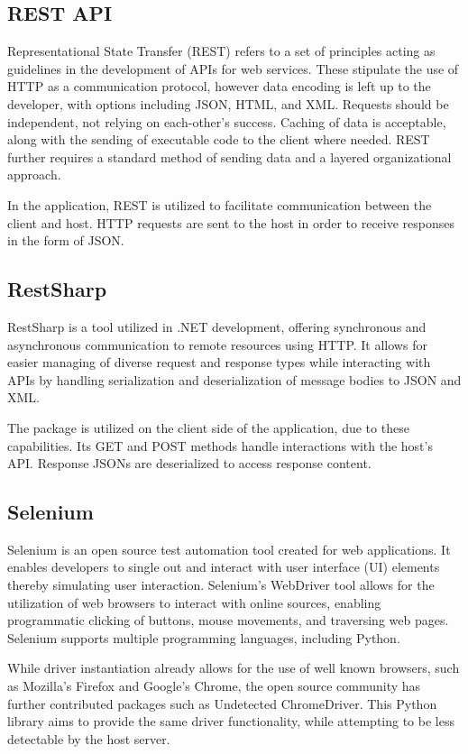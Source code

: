 \documentclass{thesis-ekf}
\theoremstyle{definition}
\theoremstyle{remark}
\begin{document}
\subsection{REST API}
Representational State Transfer (REST) refers to a set of principles acting as guidelines in the development of APIs for web services. These stipulate the use of HTTP as a communication protocol, however data encoding is left up to the developer, with options including JSON, HTML, and XML. Requests should be independent, not relying on each-other's success. Caching of data is acceptable, along with the sending of executable code to the client where needed. REST further requires a standard method of sending data and a layered organizational approach. \cite{redhat-rest}

In the application, REST is utilized to facilitate communication between the client and host. HTTP requests are sent to the host in order to receive responses in the form of JSON.  

\subsection{RestSharp}
RestSharp is a tool utilized in .NET development, offering synchronous and asynchronous communication to remote resources using HTTP. It allows for easier managing of diverse request and response types while interacting with APIs by handling serialization and deserialization of message bodies to JSON and XML. \cite{restsharp}

The package is utilized on the client side of the application, due to these capabilities. Its GET and POST methods handle interactions with the host's API. Response JSONs are deserialized to access response content.

\subsection{Selenium}
Selenium is an open source test automation tool created for web applications. It enables developers to single out and interact with user interface (UI) elements thereby simulating user interaction. Selenium's WebDriver tool allows for the utilization of web browsers to interact with online sources, enabling programmatic clicking of buttons, mouse movements, and traversing web pages. Selenium supports multiple programming languages, including Python. \cite{selenium}

While driver instantiation already allows for the use of well known browsers, such as Mozilla's Firefox and Google's Chrome, the open source community has further contributed packages such as Undetected ChromeDriver. This Python library aims to provide the same driver functionality, while attempting to be less detectable by the host server. \cite{udc}
\end{document}
